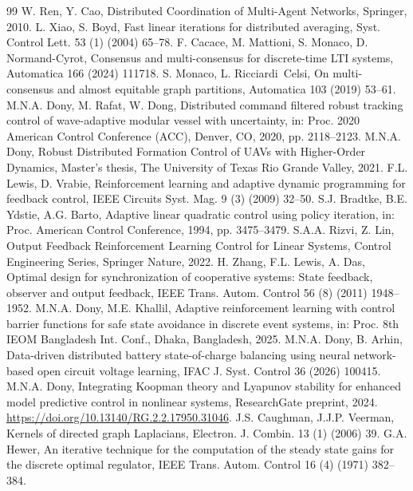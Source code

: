 \documentclass[final,5p,times]{elsarticle}
\theoremstyle{plain}
\theoremstyle{definition}
\theoremstyle{remark}
\begin{document}
\begin{thebibliography}{99}
W. Ren, Y. Cao, Distributed Coordination of Multi-Agent Networks, Springer, 2010.
L. Xiao, S. Boyd, Fast linear iterations for distributed averaging, Syst. Control Lett. 53 (1) (2004) 65--78.
F. Cacace, M. Mattioni, S. Monaco, D. Normand-Cyrot, Consensus and multi-consensus for discrete-time LTI systems, Automatica 166 (2024) 111718.
S. Monaco, L. Ricciardi~Celsi, On multi-consensus and almost equitable graph partitions, Automatica 103 (2019) 53--61.
M.N.A. Dony, M. Rafat, W. Dong, Distributed command filtered robust tracking control of wave-adaptive modular vessel with uncertainty, in: Proc. 2020 American Control Conference (ACC), Denver, CO, 2020, pp. 2118--2123.
M.N.A. Dony, Robust Distributed Formation Control of UAVs with Higher-Order Dynamics, Master's thesis, The University of Texas Rio Grande Valley, 2021.
F.L. Lewis, D. Vrabie, Reinforcement learning and adaptive dynamic programming for feedback control, IEEE Circuits Syst. Mag. 9 (3) (2009) 32--50.
S.J. Bradtke, B.E. Ydstie, A.G. Barto, Adaptive linear quadratic control using policy iteration, in: Proc. American Control Conference, 1994, pp. 3475--3479.
S.A.A. Rizvi, Z. Lin, Output Feedback Reinforcement Learning Control for Linear Systems, Control Engineering Series, Springer Nature, 2022.
H. Zhang, F.L. Lewis, A. Das, Optimal design for synchronization of cooperative systems: State feedback, observer and output feedback, IEEE Trans. Autom. Control 56 (8) (2011) 1948--1952.
M.N.A. Dony, M.E. Khallil, Adaptive reinforcement learning with control barrier functions for safe state avoidance in discrete event systems, in: Proc. 8th IEOM Bangladesh Int. Conf., Dhaka, Bangladesh, 2025.
M.N.A. Dony, B. Arhin, Data-driven distributed battery state-of-charge balancing using neural network-based open circuit voltage learning, IFAC J. Syst. Control 36 (2026) 100415.
M.N.A. Dony, Integrating Koopman theory and Lyapunov stability for enhanced model predictive control in nonlinear systems, ResearchGate preprint, 2024. \url{https://doi.org/10.13140/RG.2.2.17950.31046}.
J.S. Caughman, J.J.P. Veerman, Kernels of directed graph Laplacians, Electron. J. Combin. 13 (1) (2006) 39.
G.A. Hewer, An iterative technique for the computation of the steady state gains for the discrete optimal regulator, IEEE Trans. Autom. Control 16 (4) (1971) 382--384.
\end{thebibliography}
\endgroup
\end{document}
